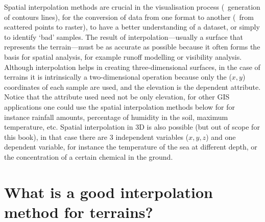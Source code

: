 Spatial interpolation methods are crucial in the visualisation process (\eg\ generation of contours lines), for the conversion of data from one format to another (\eg\ from scattered points to raster), to have a better understanding of a dataset, or simply to identify `bad' samples. 
The result of interpolation---usually a surface that represents the terrain---must be as accurate as possible because it often forms the basis for spatial analysis, for example runoff modelling or visibility analysis. 
Although interpolation helps in creating three-dimensional surfaces, in the case of terrains it is intrinsically a two-dimensional operation because only the ($x,y$) coordinates of each sample are used, and the elevation is the dependent attribute.
Notice that the attribute used need not be only elevation, for other GIS applications one could use the spatial interpolation methods below for for instance rainfall amounts, percentage of humidity in the soil, maximum temperature, etc. 
Spatial interpolation in 3D is also possible (but out of scope for this book), in that case there are 3 independent variables ($x,y,z$) and one dependent variable, for instance the temperature of the sea at different depth, or the concentration of a certain chemical in the ground.


%


\section{What is a good interpolation method for terrains?}

